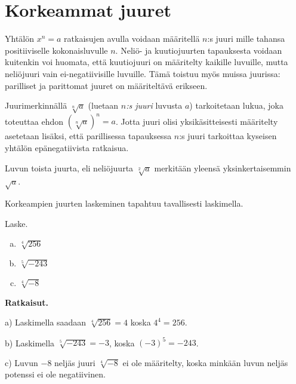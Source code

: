 \section{Korkeammat juuret}


Yhtälön $x^n=a$ ratkaisujen avulla voidaan määritellä $n$:s juuri mille tahansa positiiviselle kokonaisluvulle $n$. Neliö- ja kuutiojuurten tapauksesta voidaan kuitenkin voi huomata, että kuutiojuuri on määritelty kaikille luvuille, mutta neliöjuuri vain ei-negatiivisille luvuille. Tämä toistuu myös muissa juurissa: parilliset ja parittomat juuret on määriteltävä erikseen.

Juurimerkinnällä $\sqrt[n]{a}$ (luetaan \emph{$n$:s juuri} luvusta $a$) tarkoitetaan lukua, joka toteuttaa ehdon $(\sqrt[n]{a})^n = a$. Jotta juuri olisi yksikäsitteisesti määritelty asetetaan lisäksi, että parillisessa tapauksessa $n$:s juuri tarkoittaa kyseisen yhtälön epänegatiivista ratkaisua.




Luvun toista juurta, eli neliöjuurta $\sqrt[2]{a}$ merkitään yleensä yksinkertaisemmin $\sqrt{a}$.


Korkeampien juurten laskeminen tapahtuu tavallisesti laskimella.

\begin{esimerkki}
Laske.
\begin{enumerate}[a)]
\item $\sqrt[4]{256}$
\item $\sqrt[5]{-243}$
\item $\sqrt[4]{-8}$
\end{enumerate}

{\bf Ratkaisut.}

a) Laskimella saadaan $\sqrt[4]{256}=4$ koska $4^4=256$.

b) Laskimella $\sqrt[5]{-243}=-3$, koska $(-3)^5=-243$.

c) Luvun $-8$ neljäs juuri $\sqrt[4]{-8}$ ei ole määritelty, koska minkään luvun neljäs potenssi ei ole negatiivinen.
\end{esimerkki}

